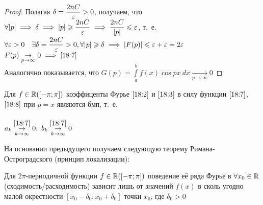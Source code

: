 \documentclass[../../main.tex]{subfiles}
\begin{document}
\begin{proof}
	Полагая $\delta = \dfrac{2nC}{\varepsilon	} > 0$, получаем, что
	$\forall |p| \implies \delta \implies |p| \geqslant
	\dfrac{2nC}{\varepsilon} \implies \dfrac{2nC}{|p|}  \leqslant \varepsilon	$, т.~е. \\
	$\forall \varepsilon	 > 0 \quad \exists \delta = \dfrac{2nC}{\varepsilon} 
	> 0,
	\forall |p| \geqslant \delta \implies |F(p)| \leqslant \varepsilon	 + \varepsilon	 
	= 2\varepsilon	$\\
	$F(p) \underset {p \rightarrow \infty}{\rightarrow} 0 
	\implies \eqref{18:7}$\\
	Аналогично показывается, что
	$G(p) = \int\limits_{a}^{b}{f(x)\cos{px}\ dx}  \underset {p \rightarrow
	 \infty}{\rightarrow} 0 $
\end{proof}

\begin{crl*}
	Для $f \in \mathbb{R}([-\pi; \pi])$ коэффиценты Фурье $\eqref{18:2}$ и
	$\eqref{18:3}$ в силу функции $\eqref{18:7}$, $\eqref{18:8}$ при
	$p=x$ являются бмп, т.~е. \\
	\\$a_k \overset{\eqref{18:7}}{\underset
		{k \rightarrow \infty}{\rightarrow}} 0, \
	b_k \overset{\eqref{18:7}}{\underset
		{k \rightarrow \infty}{\rightarrow}} 0$
\end{crl*}

\begin{rem}
	На основании предыдущего получаем следующую теорему 
	Римана-Остроградского (принцип локализации):
\end{rem}

\begin{thm}
	Для $2\pi$-периодичной функции $f\in \mathbb{R}([-\pi;\pi])$ поведение
	её ряда Фурье в $\forall x_0 \in \mathbb{R}$(сходимость/расходимость) зависит
	лишь от значений $f(x)$ в сколь угодно малой окрестности
	$[x_0 - \delta_0; x_0 + \delta_0]$ точки $x_0$, где $\delta_0 > 0$ 
\end{thm}
\end{document}
